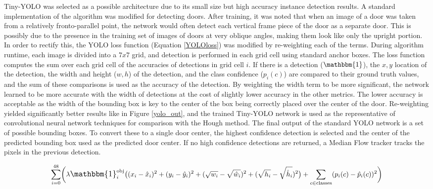 \documentclass[12pt]{article}
\begin{document}
Tiny-YOLO \cite{yolov3} was selected as a possible architecture due to its small size but high accuracy instance detection results. A standard implementation of the algorithm \cite{keras-yolo3} was modified for detecting doors. After training, it was noted that when an image of a door was taken from a relatively fronto-parallel point, the network would often detect each vertical frame piece of the door as a separate door. This is possibly due to the presence in the training set of images of doors at very oblique angles, making them look like only the upright portion. In order to rectify this, the YOLO loss function (Equation \ref{YOLOloss}) was modified by re-weighting each of the terms. During algorithm runtime, each image is divided into a $7x7$ grid, and detection is performed in each grid cell using standard anchor boxes. The loss function computes the sum over each grid cell of the accuracies of detections in grid cell $i$. If there is a detection ($\mathbbm{1}$), the $x,y$ location of the detection, the width and height ($w,h$) of the detection, and the class confidence ($p_i(c)$) are compared to their ground truth values, and the sum of these comparisons is used as the accuracy of the detection. By weighting the width term to be more significant, the network learned to be more accurate with the width of detections at the cost of slightly lower accuracy in the other metrics. The lower accuracy is acceptable as the width of the bounding box is key to the center of the box being correctly placed over the center of the door. Re-weighting yielded significantly better results like in Figure \ref{yolo_out}, and the trained Tiny-YOLO network is used as the representative of convolutional neural network techniques for comparison with the Hough method. The final output of the standard YOLO network is a set of possible bounding boxes. To convert these to a single door center, the highest confidence detection is selected and the center of the predicted bounding box used as the predicted door center. If no high confidence detections are returned, a Median Flow tracker tracks the pixels in the previous detection.

\begin{equation}
\sum_{i = 0}^{48} \biggl( \lambda \mathlarger{\mathbbm{1}}_i^{\text{obj}}\bigl((x_i - \hat{x}_i)^2 + (y_i - \hat{y}_i)^2 + (\sqrt{w_i} - \sqrt{\hat{w}_i})^2 + (\sqrt{h_i} - \sqrt{\hat{h}_i})^2\bigr) + \sum_{c \in \text{classes}} (p_i(c) - \hat{p}_i(c))^2 \biggr)
\label{YOLOloss}
\end{equation}
\end{document}
